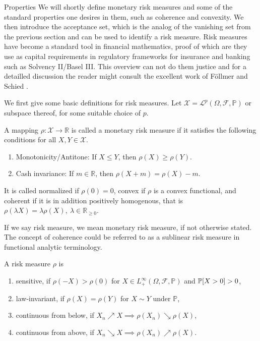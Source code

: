     \begin{subsection}{Properties}
        We will shortly define monetary risk measures and some of the standard properties  
        one desires in them, such as coherence and convexity. We then introduce the acceptance set,
        which is the analog of the vanishing set from the previous section and can be used to identify a risk measure.
        Risk measures have become a standard tool in financial mathematics, proof of which are they use as capital requirements in regulatory
        frameworks for insurance and banking such as Solvency II/Basel III. This overview can not do them justice and for a detailled discussion 
        the reader might consult the excellent work of Föllmer and Schied \cite{foellmerschied}.

        We first give some basic definitions for risk measures.
        Let \( \mathcal{X} = \mathcal{L}^p(\Omega, \mathcal{F}, \mathbb{P}) \) or subspace thereof, 
        for some suitable choice of \( p \).
        \begin{definition} \label{defriskmeasure}
        A mapping \( \rho : \mathcal{X} \to \mathbb{R} \) is called a monetary risk measure if it satisfies
        the following conditions for all \( X, Y \in \mathcal{X} \).
            \begin{enumerate}
                \item Monotonicity/Antitone: If \( X \leq Y\), then \(\rho(X) \geq \rho(Y) \).
                \item Cash invariance: If \( m \in \mathbb{R} \), then \( \rho(X + m) = \rho(X) - m \).
            \end{enumerate}
            It is called normalized if \( \rho(0) = 0 \), convex if \( \rho \) is a convex functional, and coherent if it is in addition positively homogenous,
            that is \( \rho(\lambda X) = \lambda \rho(X),\ \lambda \in \mathbb{R}_{\geq 0} \).
        \end{definition}
        \begin{remark}
        If we say risk measure, we mean monetary risk measure, if not otherwise stated. The concept of coherence could be referred to as a sublinear 
        risk measure in functional analytic terminology.
        \end{remark}
        \begin{definition}
            A risk measure \( \rho \) is
            \begin{enumerate}
                \item sensitive, if \( \rho(-X) > \rho(0) \) for \( X \in L^\infty_{+}(\Omega, \mathcal{F}, \mathbb{P}) \) and \( \mathbb{P}[X > 0] > 0 \),
                \item law-invariant, if \( \rho(X) = \rho(Y) \) for \( X \sim Y\) under \( \mathbb{P} \),
                \item continuous from below, if \( X_n \nearrow X \implies \rho(X_n) \searrow \rho(X) \),
                \item continuous from above, if \( X_n \searrow X \implies \rho(X_n) \nearrow \rho(X) \).
            \end{enumerate}
        \end{definition}


\end{subsection}
